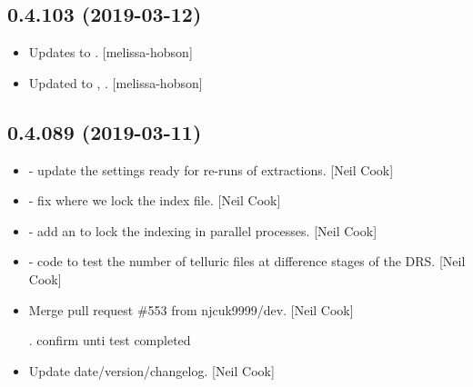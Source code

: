 \documentclass[a4paper,10pt,english]{report}
\begin{document}
\subsection{0.4.103 (2019-03-12)}
\label{\detokenize{misc/changelog:id170}}\begin{itemize}
\item {} 
Updates to . {[}melissa-hobson{]}

\item {} 
Updated to , . {[}melissa-hobson{]}

\end{itemize}


\subsection{0.4.089 (2019-03-11)}
\label{\detokenize{misc/changelog:id171}}\begin{itemize}
\item {} 
 - update the settings ready for re-runs of
extractions. {[}Neil Cook{]}

\item {} 
 - fix where we lock the index file. {[}Neil Cook{]}

\item {} 
 - add an  to lock the indexing in
parallel processes. {[}Neil Cook{]}

\item {} 
 - code to test the number of telluric files
at difference stages of the DRS. {[}Neil Cook{]}

\item {} 
Merge pull request \#553 from njcuk9999/dev. {[}Neil Cook{]}

. confirm unti test completed

\item {} 
Update date/version/changelog. {[}Neil Cook{]}

\end{itemize}
\end{document}
